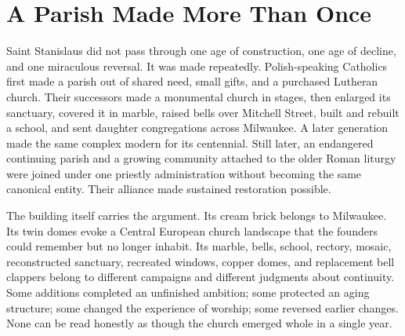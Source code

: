 \section{A Parish Made More Than Once}

Saint Stanislaus did not pass through one age of construction, one age of decline, and one miraculous reversal. It was made repeatedly. Polish-speaking Catholics first made a parish out of shared need, small gifts, and a purchased Lutheran church. Their successors made a monumental church in stages, then enlarged its sanctuary, covered it in marble, raised bells over Mitchell Street, built and rebuilt a school, and sent daughter congregations across Milwaukee. A later generation made the same complex modern for its centennial. Still later, an endangered continuing parish and a growing community attached to the older Roman liturgy were joined under one priestly administration without becoming the same canonical entity. Their alliance made sustained restoration possible.


The building itself carries the argument. Its cream brick belongs to Milwaukee. Its twin domes evoke a Central European church landscape that the founders could remember but no longer inhabit. Its marble, bells, school, rectory, mosaic, reconstructed sanctuary, recreated windows, copper domes, and replacement bell clappers belong to different campaigns and different judgments about continuity. Some additions completed an unfinished ambition; some protected an aging structure; some changed the experience of worship; some reversed earlier changes. None can be read honestly as though the church emerged whole in a single year.

